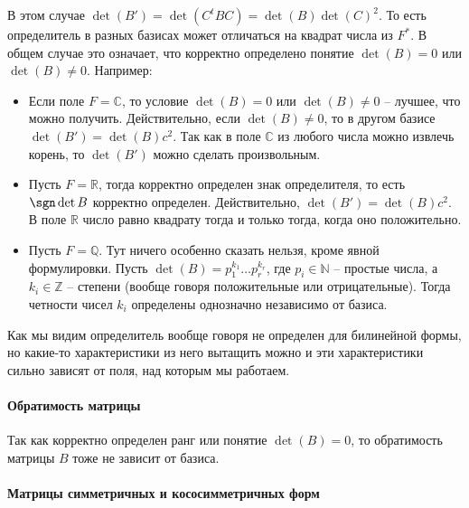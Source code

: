 В этом случае $\det(B') = \det(C^t B C) = \det(B) \det (C)^2$.
То есть определитель в разных базисах может отличаться на квадрат числа из $F^*$.
В общем случае это означает, что корректно определено понятие $\det(B) = 0$ или $\det(B)\neq 0$.
Например:
\begin{itemize}
\item Если поле $F = \mathbb C$, то условие $\det(B) = 0$ или $\det(B)\neq 0$ -- лучшее, что можно получить.
Действительно, если $\det(B)\neq 0$, то в другом базисе $\det(B') = \det(B)c^2$.
Так как в поле $\mathbb C$ из любого числа можно извлечь корень, то $\det(B')$ можно сделать произвольным.

\item Пусть $F = \mathbb R$, тогда корректно определен знак определителя, то есть $\sgn \det B$ корректно определен.
Действительно, $\det(B') = \det(B) c^2$.
В поле $\mathbb R$ число равно квадрату тогда и только тогда, когда оно положительно.

\item Пусть $F = \mathbb Q$.
Тут ничего особенно сказать нельзя, кроме явной формулировки.
Пусть $\det(B) = p_1^{k_1}\ldots p_r^{k_r}$, где $p_i\in \mathbb N$ -- простые числа, а $k_i\in \mathbb Z$ -- степени (вообще говоря положительные или отрицательные).
Тогда четности чисел $k_i$ определены однозначно независимо от базиса.
\end{itemize}

Как мы видим определитель вообще говоря не определен для билинейной формы, но какие-то характеристики из него вытащить можно и эти характеристики сильно зависят от поля, над которым мы работаем.

\paragraph{Обратимость матрицы}
Так как корректно определен ранг или понятие $\det(B) = 0$, то обратимость матрицы $B$ тоже не зависит от базиса.



\paragraph{Матрицы симметричных и кососимметричных форм}

